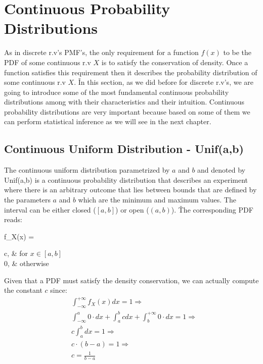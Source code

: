 \section{Continuous Probability Distributions}

As in discrete r.v's PMF's, the only requirement for a function $f(x)$ to be the PDF of some continuous r.v $X$ is to
satisfy the conservation of density. Once a function satisfies this requirement then it describes the probability
distribution of some continuous r.v $X$. \v

In this section, as we did before for discrete r.v's, we are going to introduce some of the most fundamental
continuous probability distributions among with their characteristics and their intuition. Continuous probability
distributions are very important because based on some of them we can perform statistical inference as we will see in
the next chapter.

\subsection{Continuous Uniform Distribution - Unif(a,b)}

The continuous uniform distribution parametrized by $a$ and $b$ and denoted by Unif(a,b) is a continuous probability
distribution that describes an experiment where there is an arbitrary outcome that lies between bounds that are
defined by the parameters $a$ and $b$ which are the minimum and maximum values. The interval can be either closed
($[a, b]$) or open ($(a, b)$). \v

The corresponding PDF reads:

\bse
f_{X}(x) = \begin{cases*} c, & for $x \in [a,b]$ \\ 0, & otherwise \end{cases*}
\ese
\ed

Given that a PDF must satisfy the density conservation, we can actually compute the constant $c$ since:
{\setlength{\jot}{10pt}
\begin{align*}
& \int_{-\infty}^{+\infty} f_{X}(x) dx = 1 \Rightarrow \\
& \int_{-\infty}^{a} 0 \cdot dx + \int_{a}^{b} c dx + \int_{b}^{+\infty} 0 \cdot dx = 1 \Rightarrow \\
& c \int_{a}^{b} dx = 1 \Rightarrow \\
& c \cdot (b-a) = 1 \Rightarrow \\
& c = \frac{1}{b-a}
\end{align*}}

